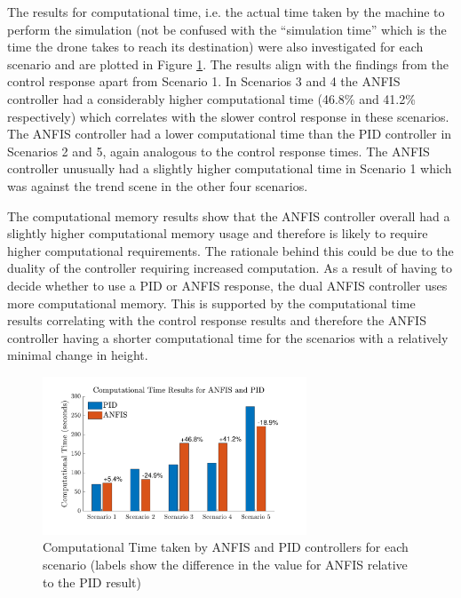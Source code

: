 The results for computational time, i.e. the actual time taken by the machine to perform the simulation (not be confused with the ``simulation time'' which is the time the drone takes to reach its destination) were also investigated for each scenario and are plotted in Figure \ref{fig:comp_time}. The results align with the findings from the control response apart from Scenario 1. In Scenarios 3 and 4 the ANFIS controller had a considerably higher computational time (46.8\% and 41.2\% respectively) which correlates with the slower control response in these scenarios. The ANFIS controller had a lower computational time than the PID controller in Scenarios 2 and 5, again analogous to the control response times. The ANFIS controller unusually had a slightly higher computational time in Scenario 1 which was against the trend scene in the other four scenarios. 

The computational memory results show that the ANFIS controller overall had a slightly higher computational memory usage and therefore is likely to require higher computational requirements. The rationale behind this could be due to the duality of the controller requiring increased computation. As a result of having to decide whether to use a PID or ANFIS response, the dual ANFIS controller uses more computational memory. This is supported by the computational time results correlating with the control response results and therefore the ANFIS controller having a shorter computational time for the scenarios with a relatively minimal change in height. 
\begin{figure}[H]
    \centering
    \includegraphics[width = 0.7\textwidth]{img/Computational Time.pdf}
    \caption{Computational Time taken by ANFIS and PID controllers for each scenario (labels show the difference in the value for ANFIS relative to the PID result)}
    \label{fig:comp_time}
\end{figure}